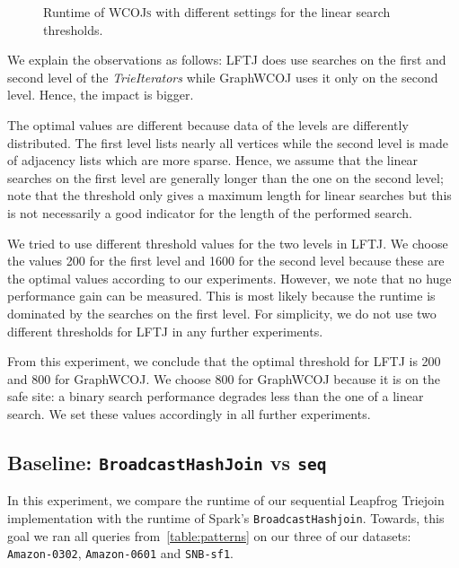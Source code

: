 \begin{figure}
    \centering
    \caption{Runtime of \textsc{WCOJs} with different settings for the linear search thresholds.}
    \label{fig:linear-search-threshold}
\end{figure}

We explain the observations as follows: \textsc{LFTJ} does use searches on the first
and second level of the \textit{TrieIterators} while GraphWCOJ uses it only on the second
level.
Hence, the impact is bigger.

The optimal values are different because data of the levels are differently distributed.
The first level lists nearly all vertices while the second level is made of adjacency lists which are more
sparse.
Hence, we assume that the linear searches on the first level are generally longer than
the one on the second level;
note that the threshold only gives a maximum length for linear searches but this is not
necessarily a good indicator for the length of the performed search.

We tried to use different threshold values for the two levels in \textsc{LFTJ}.
We choose the values 200 for the first level and 1600 for the second level because these
are the optimal values according to our experiments.
However, we note that no huge performance gain can be measured.
This is most likely because the runtime is dominated by the searches on the first level.
For simplicity, we do not use two different thresholds for \textsc{LFTJ} in any further experiments.

From this experiment, we conclude that the optimal threshold for \textsc{LFTJ} is 200 and 800
for GraphWCOJ.
We choose 800 for GraphWCOJ because it is on the safe site:
a binary search performance degrades less than the one of a linear search.
We set these values accordingly in all further experiments.


\subsection{Baseline: \texttt{BroadcastHashJoin} vs \texttt{seq}} \label{subsec:spark-vs-lftj}
In this experiment, we compare the runtime of our sequential Leapfrog Triejoin implementation with the runtime of Spark's \texttt{BroadcastHashjoin}.
Towards, this goal we ran all queries from~\cref{table:patterns} on our three of our datasets: \texttt{Amazon-0302}, \texttt{Amazon-0601}
and
\texttt{SNB-sf1}.


